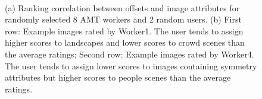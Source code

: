 \documentclass[10pt,twocolumn,letterpaper]{article}
\begin{document}
\begingroup
\let\clearpage\relax



\begin{figure}
\centering
{}\\
\vspace{-0.1in}
\vspace{-0.15in}

\caption{(a) Ranking correlation between offsets and image attributes for randomly selected 8 AMT workers and 2 random users. (b) First row: Example images rated by Worker1. The user tends to assign higher scores to landscapes and lower scores to crowd scenes than the average ratings; Second row: Example images rated by Worker4. The user tends to assign lower scores to images containing symmetry attributes but higher scores to people scenes than the average ratings.}\label{corrTurker}
\vspace{-0.1in}
\end{figure}

\end{document}
